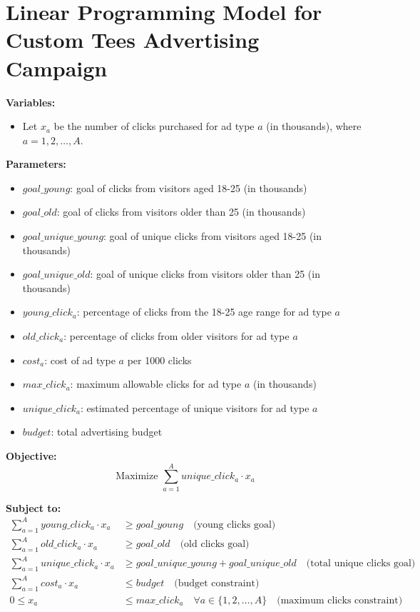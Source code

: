 \documentclass{article}
\begin{document}
\section*{Linear Programming Model for Custom Tees Advertising Campaign}

\textbf{Variables:}
\begin{itemize}
    \item Let $x_a$ be the number of clicks purchased for ad type $a$ (in thousands), where $a = 1, 2, \ldots, A$.
\end{itemize}

\textbf{Parameters:}
\begin{itemize}
    \item $goal\_young$: goal of clicks from visitors aged 18-25 (in thousands)
    \item $goal\_old$: goal of clicks from visitors older than 25 (in thousands)
    \item $goal\_unique\_young$: goal of unique clicks from visitors aged 18-25 (in thousands)
    \item $goal\_unique\_old$: goal of unique clicks from visitors older than 25 (in thousands)
    \item $young\_click_a$: percentage of clicks from the 18-25 age range for ad type $a$
    \item $old\_click_a$: percentage of clicks from older visitors for ad type $a$
    \item $cost_a$: cost of ad type $a$ per 1000 clicks
    \item $max\_click_a$: maximum allowable clicks for ad type $a$ (in thousands)
    \item $unique\_click_a$: estimated percentage of unique visitors for ad type $a$
    \item $budget$: total advertising budget
\end{itemize}

\textbf{Objective:}
\[
\text{Maximize } \sum_{a=1}^{A} unique\_click_a \cdot x_a
\]

\textbf{Subject to:}
\begin{align*}
    \sum_{a=1}^{A} young\_click_a \cdot x_a & \geq goal\_young \quad \text{(young clicks goal)} \\
    \sum_{a=1}^{A} old\_click_a \cdot x_a & \geq goal\_old \quad \text{(old clicks goal)} \\
    \sum_{a=1}^{A} unique\_click_a \cdot x_a & \geq goal\_unique\_young + goal\_unique\_old \quad \text{(total unique clicks goal)} \\
    \sum_{a=1}^{A} cost_a \cdot x_a & \leq budget \quad \text{(budget constraint)} \\
    0 \leq x_a & \leq max\_click_a \quad \forall a \in \{1, 2, \ldots, A\} \quad \text{(maximum clicks constraint)}
\end{align*}
\end{document}
